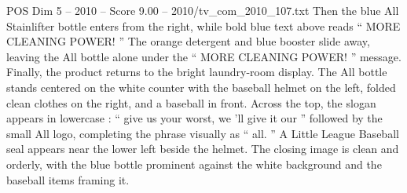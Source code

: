 \begin{textsample}{POS Dim 5 – 2010 – Score 9.00 – 2010/tv\_com\_2010\_107.txt}
Then the blue All Stainlifter bottle enters from the right, while bold blue text above reads “ MORE CLEANING POWER! ” The orange detergent and blue booster slide away, leaving the All bottle alone under the “ MORE CLEANING POWER! ” message.
Finally, the product returns to the bright laundry-room display.
The All bottle stands centered on the white counter with the baseball helmet on the left, folded clean clothes on the right, and a baseball in front.
Across the top, the slogan appears in lowercase : “ give us your worst, we ’ll give it our ” followed by the small All logo, completing the phrase visually as “ all. ” A Little League Baseball seal appears near the lower left beside the helmet.
The closing image is clean and orderly, with the blue bottle prominent against the white background and the baseball items framing it.

\end{textsample}
